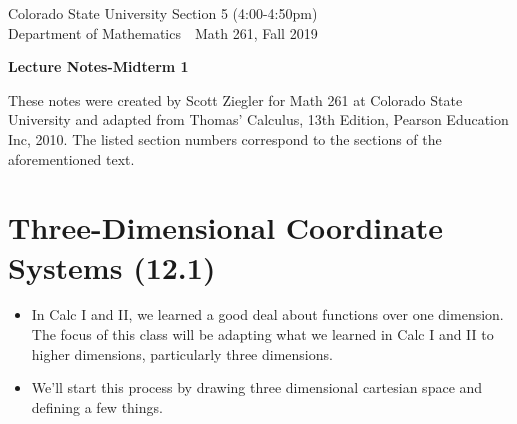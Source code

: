 \documentclass[12pt, letter]{article}
\theoremstyle{plain}
\numberwithin{theorem}{section}
\theoremstyle{definition}
\begin{document}

\noindent
Colorado State University \hfill Section 5 (4:00-4:50pm)\\
Department of Mathematics\ \  \hfill  Math 261, Fall 2019\\
\bigskip
\thispagestyle{empty}

\begin{center}
\begin{large}
\textbf{Lecture Notes-Midterm 1\\
}
\end{large}
\end{center}


\noindent These notes were created by Scott Ziegler for Math 261 at Colorado State University and adapted from Thomas' Calculus, 13th Edition, Pearson Education Inc, 2010. The listed section numbers correspond to the sections of the aforementioned text.



\section{Three-Dimensional Coordinate Systems (12.1)}

\begin{itemize}
\item In Calc I and II, we learned a good deal about functions over one dimension. The focus of this class will be adapting what we learned in Calc I and II to higher dimensions, particularly three dimensions.
\item We'll start this process by drawing three dimensional cartesian space and defining a few things.
\end{itemize}

\hrulefill
\end{document}

